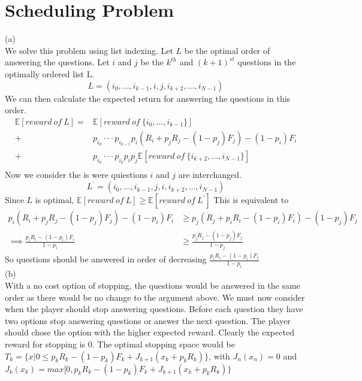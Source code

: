 \documentclass[11pt, oneside]{article}   	%
\begin{document}
\section{Scheduling Problem}
(a) \\
We solve this problem using list indexing. Let $L$ be the optimal order of answering the questions. Let $i$ and $j$ be the $k^{th}$ and $(k + 1)^{st}$ questions in the optimally ordered list L.
$$
L = (i_{0},...,i_{k-1},i,j,i_{k+2},...,i_{N-1})
$$
We can then calculate the expected return for answering the questions in this order.
\begin{align*}
\mathbb{E}[{reward~of~L}] = & \mathbb{E} [reward~of~\{i_{0},...,i_{k-1}\}] \\
+ & p_{i_{0}}···p_{i_{k-1}} p_{i}(R_{i}+p_{j}R_{j} -(1-p_{j})F_{j})-(1-p_{i})F_{i}  \\
+ & p_{i_{0}} ···p_{i_{k}} p_{i}p_{j} \mathbb{E}[reward~of~\{i_{k+2},...,i_{N-1}\}] \\
\end{align*}
Now we consider the is were quiestions $i$ and $j$ are interchanged.
$$
L^{\prime} = (i_{0},...,i_{k-1},j,i,i_{k+2},...,i_{N-1})
$$
Since $L$ is optimal, $\mathbb{E}[{reward~of~L}] \geq \mathbb{E}[{reward~of~L^{\prime}}]$
This is equivalent to 
\begin{align*}
p_{i}(R_{i}+p_{j}R_{j} -(1-p_{j})F_{j})-(1-p_{i})F_{i} &\geq p_{j}(R_{j}+p_{i}R_{i} -(1-p_{i})F_{i})-(1-p_{j})F_{j} \\
\implies \frac{p_{i}R_{i}-(1-p_{i})F_{i}}{1-p_{i}} &\geq \frac{p_{j}R_{j}-(1-p_{j})F_{j}}{1-p_{j}}
\end{align*}
So questions should be answered in order of decreasing $\frac{p_{i}R_{i}-(1-p_{i})F_{i}}{1-p_{i}}$ \\
(b) \\
With a no cost option of stopping, the questions would be answered in the same order as there would be no change to the argument above. We must now consider when the player should stop answering questions. Before each question they have two options stop answering questions or answer the next question. The player should chose the option with the higher expected reward. Clearly the expected reward for stopping is 0. The optimal stopping space would be $T_{k}=\{x|0 \leq  p_{k}R_{k}-(1-p_{k})F_{k} + J_{k+1}(x_{k}+p_{k}R_{k} ) \}$, with $J_{n}(x_{n})=0$ and $J_{k}(x_{k}) = max[0, p_{k}R_{k}-(1-p_{k})F_{k} + J_{k+1}(x_{k}+p_{k}R_{k} ) \}$
\end{document}
